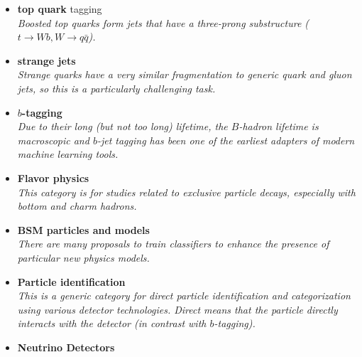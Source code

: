 \documentclass[12pt,letterpaper]{article}
\begin{document}
\begin{itemize}
\begin{itemize}
\begin{itemize}
			\item \textbf{top quark} tagging~\cite{Almeida:2015jua,Stoye:DLPS2017,Kasieczka:2019dbj,Chakraborty:2020yfc,Diefenbacher:2019ezd,Butter:2017cot,Kasieczka:2017nvn,Macaluso:2018tck,Bhattacharya:2020vzu,Lim:2020igi,Dreyer:2020brq,Aguilar-Saavedra:2021rjk}
			\\\textit{Boosted top quarks form jets that have a three-prong substructure ($t\rightarrow Wb,W\rightarrow q\bar{q}$).}
			\item \textbf{strange jets}~\cite{Nakai:2020kuu,Erdmann:2019blf,Erdmann:2020ovh}
			\\\textit{Strange quarks have a very similar fragmentation to generic quark and gluon jets, so this is a particularly challenging task.}
			\item \textbf{$b$-tagging}~\cite{Sirunyan:2017ezt,Guest:2016iqz,bielkov2020identifying,Bols:2020bkb}
			\\\textit{Due to their long (but not too long) lifetime, the $B$-hadron lifetime is macroscopic and $b$-jet tagging has been one of the earliest adapters of modern machine learning tools.}
			\item \textbf{Flavor physics}~\cite{1811097}
			\\\textit{This category is for studies related to exclusive particle decays, especially with bottom and charm hadrons.}
			\item \textbf{BSM particles and models}~\cite{Datta:2019ndh,Baldi:2014kfa,Chakraborty:2019imr,10.1088/2632-2153/ab9023,1792136,1801423,Chang:2020rtc,Cogollo:2020afo,Grossi:2020orx,Ngairangbam:2020ksz,Englert:2020ntw,Freitas:2020ttd,Khosa:2019kxd,Freitas:2019hbk}
			\\\textit{There are many proposals to train classifiers to enhance the presence of particular new physics models.}
			\item \textbf{Particle identification}~\cite{deOliveira:2018lqd,Paganini:DLPS2017,Hooberman:DLPS2017,Belayneh:2019vyx,Qasim:2019otl,Collado:2020fwm,Verma:2021ixg}
			\\\textit{This is a generic category for direct particle identification and categorization using various detector technologies.  Direct means that the particle directly interacts with the detector (in contrast with $b$-tagging).}
			\item \textbf{Neutrino Detectors}~\cite{Adams:2018bvi,Aurisano:2016jvx,Acciarri:2016ryt,Hertel:DLPS2017,Aiello:2020orq,Adams:2020vlj,Domine:2020tlx,1805474,1808859,Psihas:2020pby,alonsomonsalve2020graph,Abratenko:2020pbp,Clerbaux:2020ttg,Liu:2020pzv,Abratenko:2020ocq,Chen:2020zkj,Qian:2021vnh,abbasi2021convolutional,Drielsma:2021jdv,Rossi:2021tjf,Hewes:2021heg,Acciarri:2021oav,Belavin:2021bxb}

\end{itemize}
\end{itemize}
\end{itemize}
\end{document}
